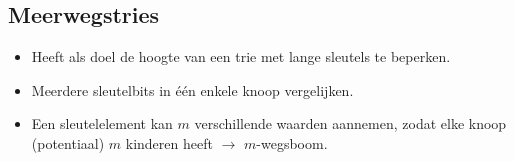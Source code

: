 \subsection{Meerwegstries}
\begin{itemize}
    \item Heeft als doel de hoogte van een trie met lange sleutels te beperken.
    \item Meerdere sleutelbits in één enkele knoop vergelijken.
    \item Een sleutelelement kan $m$ verschillende waarden aannemen, zodat elke knoop (potentiaal) $m$ kinderen heeft $\rightarrow$ $m$-wegsboom.
\end{itemize}